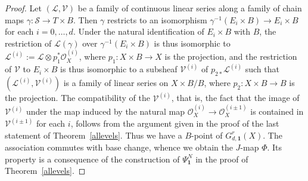 \documentclass[a4paper,11pt]{amsart}
\theoremstyle{plain}
\theoremstyle{definition}
\theoremstyle{remark}
\def\L{\mathcal{L}}
\def\V{\mathcal{V}}
\def\:{\colon}
\begin{document}
\begin{proof} Let $(\L,\V)$ be a family of continuous linear series along a family of chain maps $\gamma\:\mathcal S\to T\times B$. Then $\gamma$ restricts to an isomorphism $\gamma^{-1}(E_i\times B)\to E_i\times B$ for each $i=0,\dots,d$. Under the natural identification of $E_i\times B$ with $B$, the restriction of 
$\L(\gamma)$ over $\gamma^{-1}(E_i\times B)$ is thus isomorphic to
$\L^{(i)}:=\L\otimes p_1^*\mathcal O_X^{(i)}$, where $p_1\:X\times B\to X$ is the projection, and the restriction of $\V$ to $E_i\times B$ is 
thus isomorphic to a subsheaf $\V^{(i)}$ of $p_{2*}\L^{(i)}$ such that 
$(\L^{(i)},\V^{(i)})$ is a family of linear series on $X\times B/B$, where $p_2\:X\times B\to B$ is the projection. The compatibility of the $\V^{(i)}$, that is, the fact that the image of $\V^{(i)}$ under the map induced by the natural map $\mathcal O_X^{(i)}\to\mathcal O_X^{(i\pm 1)}$ is contained in
$\V^{(i\pm 1)}$ for each $i$, follows from the argument given in the proof of the last statement of Theorem~\ref{allevels}. Thus we have a $B$-point of $G^{r}_{d,\mathbf 1}(X)$. The association commutes with base change, whence we obtain the $J$-map $\Phi$. Its property is a consequence of the construction of $\Psi_{\mathbf 1}^N$ in the proof of Theorem~\ref{allevels}.
\end{proof}







\end{document}
